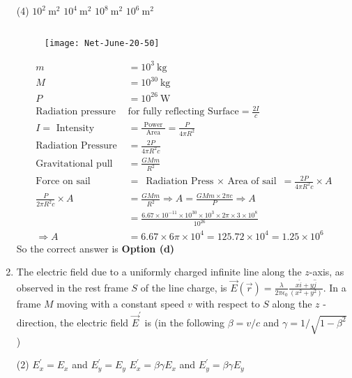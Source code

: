 \begin{enumerate}
 \begin{tasks}(4)
	\task[\textbf{a.}]$10^{2} \mathrm{~m}^{2}$
	\task[\textbf{b.}]$10^{4} \mathrm{~m}^{2}$
	\task[\textbf{c.}]$10^{8} \mathrm{~m}^{2}$
	\task[\textbf{d.}] $10^{6} \mathrm{~m}^{2}$
\end{tasks}
\begin{answer}$\left. \right. $
	\begin{figure}[H]
		\centering
		\texttt{[image: Net-June-20-50]}
	\end{figure}
	\begin{align*}
	m&=10^{3} \mathrm{~kg}\\
	M&=10^{30} \mathrm{~kg} \\
	P&=10^{26} \mathrm{~W}\\
	\text{Radiation pressure  }&\text{for fully reflecting Surface}=\frac{2 I}{c}\\
	I=\text { Intensity }&=\frac{\text { Power }}{\text { Area }}=\frac{P}{4 \pi R^{2}}\\
	\text{Radiation Pressure }&=\frac{2 P}{4 \pi R^{2} c}\\
	\text{Gravitational pull }&=\frac{G M m}{R^{2}}\\
	\text{Force on sail }&=\text{ Radiation Press $\times$ Area of sail }=\frac{2 P}{4 \pi R^{2} c} \times A\\
	\frac{P}{2 \pi R^{2} c} \times A&=\frac{G M m}{R^{2}} \Rightarrow A=\frac{G M m \times 2 \pi c}{P} \Rightarrow A\\&=\frac{6.67 \times 10^{-11} \times 10^{30} \times 10^{3} \times 2 \pi \times 3 \times 10^{8}}{10^{26}} \\
	\Rightarrow A&=6.67 \times 6 \pi \times 10^{4}=125.72 \times 10^{4}=1.25 \times 10^{6}
	\end{align*}
		So the correct answer is \textbf{Option (d)}
\end{answer}
\item The electric field due to a uniformly charged infinite line along the $z$-axis, as observed in the rest frame $S$ of the line charge, is $\vec{E}(\vec{r})=\frac{\lambda}{2 \pi \epsilon_{0}} \frac{x \hat{i}+y \hat{j}}{\left(x^{2}+y^{2}\right)}$. In a frame $M$ moving with a constant speed $v$ with respect to $S$ along the $z$ - direction, the electric field $\vec{E}^{\prime}$ is (in the following $\beta=v / c$ and $\gamma=1 / \sqrt{1-\beta^{2}}$ )
 \begin{tasks}(2)
	\task[\textbf{a.}]$E_{x}^{\prime}=E_{x}$ and $E_{y}^{\prime}=E_{y}$
	\task[\textbf{b.}]$E_{x}^{\prime}=\beta \gamma E_{x}$ and $E_{y}^{\prime}=\beta \gamma E_{y}$

\end{tasks}
\end{enumerate}
